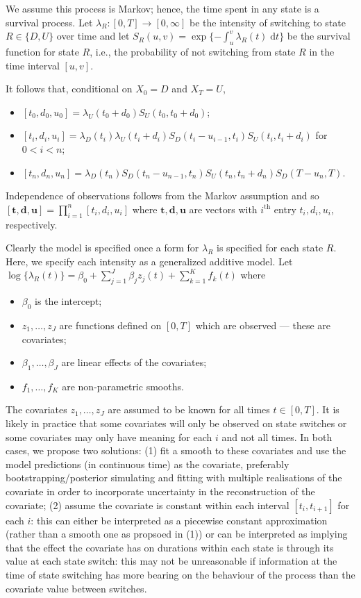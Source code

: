 \documentclass[referee]{rgclass}
\begin{document}
We assume this process is Markov; hence, the time spent in any state is a survival process. Let $\lambda_R:[0,T] \to [0,\infty]$ be the intensity of switching to state $R \in \{D, U\}$ over time and let $S_R(u, v) = \exp\{-\int_u^v \lambda_R(t)\;\mathrm{d}t\}$ be the survival function for state $R$, i.e., the probability of not switching from state $R$ in the time interval $[u, v]$.  

 It follows that, conditional on \(X_0 = D\) and \(X_T = U\),  
\begin{itemize}
\item $[t_0, d_0, u_0] = \lambda_U(t_0 + d_0)S_U(t_0, t_0 + d_0)$; 
\item $[t_i, d_i, u_i] = \lambda_D(t_i)\lambda_U(t_i + d_i)S_D(t_i - u_{i - 1}, t_i)S_U(t_i, t_i + d_i)$ for $0 < i < n$; 
\item $[t_n, d_n, u_n] = \lambda_D(t_n)S_D(t_n - u_{n - 1}, t_n)S_U(t_n, t_n + d_n)S_D(T - u_n, T)$. 
\end{itemize}  
 

Independence of observations follows from the Markov assumption and so $[\bm{t}, \bm{d}, \bm{u}] = \prod_{i = 1}^n [t_i, d_i, u_i]$ where $\bm{t}, \bm{d}, \bm{u}$ are vectors with $i^{\text{th}}$ entry $t_i, d_i, u_i$, respectively. 

Clearly the model is specified once a form for $\lambda_R$ is specified for each state $R$. Here, we specify each intensity as a generalized additive model. Let $\log\{\lambda_R(t)\}  =  \beta_0 + \sum_{j = 1}^J \beta_jz_j(t) + \sum_{k  = 1}^K f_k(t)$ where 
\begin{itemize}
\item $\beta_0$ is the intercept; 
\item $z_1, \ldots, z_J$ are functions defined on \([0,T]\) which are observed --- these are covariates; 
\item $\beta_1, \ldots, \beta_J$ are linear effects of the covariates; 
\item $f_1, \ldots, f_K$ are non-parametric smooths.  
\end{itemize}

The covariates $z_1, \ldots, z_J$ are assumed to be known for all times $t \in [0,T]$. It is likely in practice that some covariates will only be observed on state switches or some covariates may only have meaning for each $i$ and not all times. In both cases, we propose two solutions: (1) fit a smooth to these covariates and use the model predictions (in continuous time) as the covariate, preferably bootstrapping/posterior simulating and fitting with multiple realisations of the covariate in order to incorporate uncertainty in the reconstruction of the covariate; (2) assume the covariate is constant within each interval $[t_i, t_{i + 1}]$ for each $i$: this can either be interpreted as a piecewise constant approximation (rather than a smooth one as propsoed in (1)) or can be interpreted as implying that the effect the covariate has on durations within each state is through its value at each state switch: this may not be unreasonable if information at the time of state switching has more bearing on the behaviour of the process than the covariate value between switches.  
\end{document}
